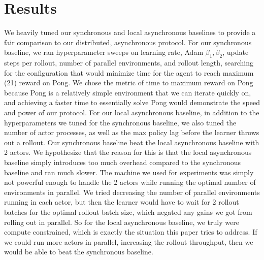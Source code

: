 \documentclass{article}
\begin{document}
\section{Results}
We heavily tuned our synchronous and local asynchronous baselines to provide a fair comparison to our distributed, asynchronous
protocol. For our synchronous baseline, we ran hyperparameter sweeps on learning rate, Adam $\beta_1, \beta_2$, update steps per
rollout, number of parallel environments, and rollout length, searching for the configuration that would minimize time for the agent
to reach maximum (21) reward on Pong. We chose the metric of time to maximum reward on Pong because Pong is a relatively simple
environment that we can iterate quickly on, and achieving a faster time to essentially solve Pong would demonstrate the speed and
power of our protocol. For our local asynchronous baseline, in addition to the hyperparameters we tuned for the synchronous baseline,
we also tuned the number of actor processes, as well as the max policy lag before the learner throws out a rollout.
Our synchronous baseline beat the local asynchronous baseline with 2 actors. We hypothesize that the reason for this is that
the local asynchronous baseline simply introduces too much overhead compared to the synchronous baseline and ran much slower.
The machine we used for experiments was simply not powerful enough to handle the 2 actors while running the optimal number of
environments in parallel. We tried decreasing the number of parallel environments running in each actor, but then the learner would
have to wait for 2 rollout batches for the optimal rollout batch size, which negated any gains we got from rolling out in parallel.
So for the local asynchronous baseline, we truly were compute constrained, which is exactly the situation this paper tries to address.
If we could run more actors in parallel, increasing the rollout throughput, then we would be able to beat the synchronous baseline.
\end{document}
